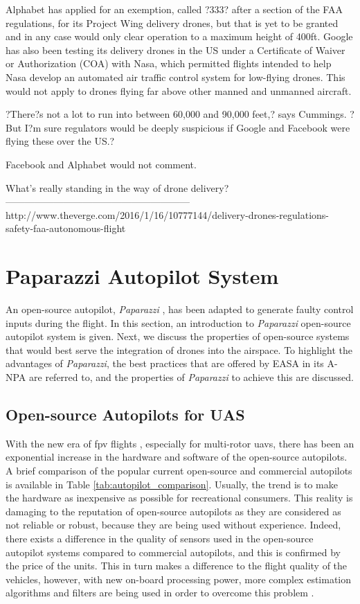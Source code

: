 Alphabet has applied for an exemption, called ?333? after a section of the FAA regulations, for its Project Wing delivery drones, but that is yet to be granted and in any case would only clear operation to a maximum height of 400ft. Google has also been testing its delivery drones in the US under a Certificate of Waiver or Authorization (COA) with Nasa, which permitted flights intended to help Nasa develop an automated air traffic control system for low-flying drones. This would not apply to drones flying far above other manned and unmanned aircraft.

?There?s not a lot to run into between 60,000 and 90,000 feet,? says Cummings. ?But I?m sure regulators would be deeply suspicious if Google and Facebook were flying these over the US.?

Facebook and Alphabet would not comment.

What's really standing in the way of drone delivery?
---------------------------------------------------------
http://www.theverge.com/2016/1/16/10777144/delivery-drones-regulations-safety-faa-autonomous-flight
\fi

\section{Paparazzi Autopilot System}
An open-source autopilot, \emph{Paparazzi} \cite{brisset2006paparazzi}, has been adapted to generate faulty control inputs during the flight. 
In this section, an introduction to \emph{Paparazzi} open-source autopilot system is given.
Next, we discuss the properties of open-source systems that would best serve the integration of drones into the airspace. 
To highlight the advantages of \emph{Paparazzi}, the best practices that are offered by EASA in its A-NPA \cite{A_NPA_EASA2015} are referred to, and the properties of \emph{Paparazzi} to achieve this are discussed.

\subsection{Open-source Autopilots for UAS}
With the new era of \gls{fpv} flights \cite{whatIsFPV}, especially for multi-rotor \gls{uav}s, there has been an exponential increase in the hardware and software of the open-source autopilots. A brief comparison of the popular current open-source and commercial autopilots is available in Table \ref{tab:autopilot_comparison}. Usually, the trend is to make the hardware as inexpensive as possible for recreational consumers. This reality is damaging to the reputation of open-source autopilots as they are considered as not reliable or robust, because they are being used without experience. Indeed, there exists a difference in the quality of sensors used in the open-source autopilot systems compared to commercial autopilots, and this is confirmed by the price of the units. This in turn makes a difference to the flight quality of the vehicles, however, with new on-board processing power, more complex estimation algorithms and filters are being used in order to overcome this problem \cite{baskaya2016flexible}.

